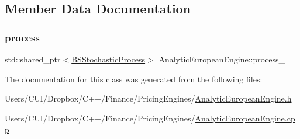 \subsection{Member Data Documentation}
\hypertarget{class_analytic_european_engine_ae9464c6b8aa8b9321b37a8e18b9c785a}{}\label{class_analytic_european_engine_ae9464c6b8aa8b9321b37a8e18b9c785a} 
\subsubsection{\texorpdfstring{process\+\_\+}{process\_}}
{\footnotesize\ttfamily std\+::shared\+\_\+ptr$<$\hyperlink{class_b_s_stochastic_process}{B\+S\+Stochastic\+Process}$>$ Analytic\+European\+Engine\+::process\+\_\+\hspace{0.3cm}{\ttfamily [private]}}



The documentation for this class was generated from the following files\+:\begin{DoxyCompactItemize}
\item 
Users/\+C\+U\+I/\+Dropbox/\+C++/\+Finance/\+Pricing\+Engines/\hyperlink{_analytic_european_engine_8h}{Analytic\+European\+Engine.\+h}\item 
Users/\+C\+U\+I/\+Dropbox/\+C++/\+Finance/\+Pricing\+Engines/\hyperlink{_analytic_european_engine_8cpp}{Analytic\+European\+Engine.\+cpp}\end{DoxyCompactItemize}
